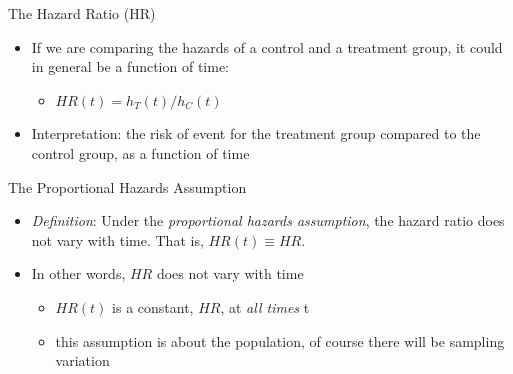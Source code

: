 \documentclass[
  ignorenonframetext,
]{beamer}
\providecommand{\tightlist}{%
  \setlength{\itemsep}{0pt}\setlength{\parskip}{0pt}}
\begin{document}
\begin{frame}{The Hazard Ratio (HR)}
\protect\hypertarget{the-hazard-ratio-hr}{}

\begin{itemize}
\tightlist
\item
  If we are comparing the hazards of a control and a treatment group, it
  could in general be a function of time:

  \begin{itemize}
  \tightlist
  \item
    \(HR(t) = h_T(t) / h_C(t)\)
  \end{itemize}
\item
  Interpretation: the risk of event for the treatment group compared to
  the control group, as a function of time
\end{itemize}

\end{frame}

\begin{frame}{The Proportional Hazards Assumption}
\protect\hypertarget{the-proportional-hazards-assumption}{}

\begin{itemize}
\item
  \emph{Definition}: Under the \emph{proportional hazards assumption},
  the hazard ratio does not vary with time. That is,
  \(HR(t) \equiv HR\).
\item
  In other words, \(HR\) does not vary with time

  \begin{itemize}
  \tightlist
  \item
    \(HR(t)\) is a constant, \(HR\), at \emph{all times} t
  \item
    this assumption is about the population, of course there will be
    sampling variation
  \end{itemize}
\end{itemize}

\end{frame}
\end{document}
